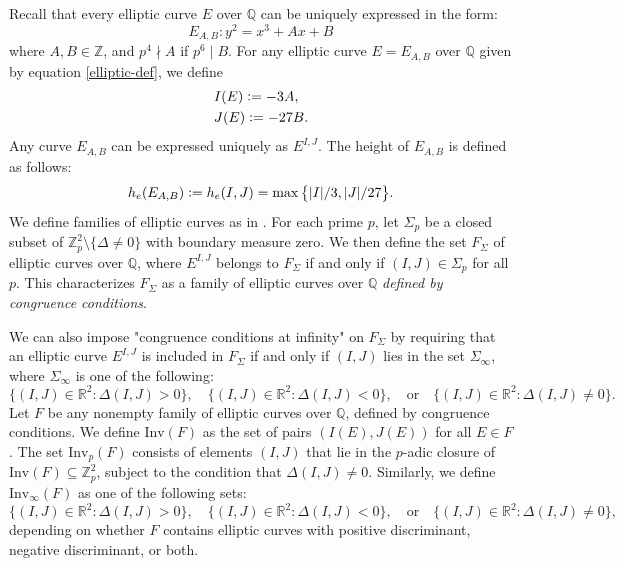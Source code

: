 \documentclass{article}
\begin{document}
Recall that every elliptic curve $E$ over $\mathbb{Q}$ can be uniquely expressed in the form:
\begin{equation}\label{elliptic-def}
E_{A,B}: y^2 = x^3 + Ax + B
\end{equation}
where $A, B \in \mathbb{Z}$, and  $p^4 \nmid A$ if $p^6 \mid B$. For any elliptic curve $E = E_{A,B}$ over $\mathbb{Q}$ given by equation \eqref{elliptic-def}, we define
\begin{equation*}
\begin{aligned}
&I(E) \vcentcolon=  - 3  A, \\
&J(E) \vcentcolon= -27  B.
\end{aligned}
\end{equation*}
Any curve $E_{A,B}$ can be expressed uniquely as $E^{I,J}$. The height of $E_{A,B}$ is defined as follows:
\begin{equation*}
h_e(E_{A,B}) \vcentcolon= h_e(I,J)  = \max \big\{|I|/3,|J|/27\big \}.
\end{equation*}
We define families of elliptic curves as in \cite{main}. For each prime $p$, let $\Sigma_p$ be a closed subset of $\mathbb{Z}_p^2 \setminus \{\Delta \neq 0\}$ with boundary measure zero. We then define the set $F_{\Sigma}$ of elliptic curves over $\mathbb{Q}$, where $E^{I,J}$ belongs to $F_{\Sigma}$ if and only if $(I, J) \in \Sigma_p$ for all $p$. This characterizes $F_{\Sigma}$ as a family of elliptic curves over $\mathbb{Q}$ \textit{defined by congruence conditions}.

We can also impose "congruence conditions at infinity" on $F_{\Sigma}$ by requiring that an elliptic curve $E^{I,J}$ is included in $F_{\Sigma}$ if and only if $(I, J)$ lies in the set $\Sigma_{\infty}$, where $\Sigma_{\infty}$ is one of the following: 
\begin{equation*}
\{(I, J) \in \mathbb{R}^2 : \Delta(I, J) > 0\}, \quad \{(I, J) \in \mathbb{R}^2 : \Delta(I, J) < 0\}, \quad \text{or} \quad \{(I, J) \in \mathbb{R}^2 : \Delta(I, J) \neq 0\}.
\end{equation*}
Let $F$ be any nonempty family of elliptic curves over $\mathbb{Q}$, defined by congruence conditions. We define $\mathrm{Inv}(F)$ as the set of pairs $(I(E), J(E))$ for all $E \in F$. The set $\mathrm{Inv}_p(F)$ consists of elements $(I, J)$ that lie in the $p$-adic closure of $\mathrm{Inv}(F) \subseteq \mathbb{Z}_p^2$, subject to the condition that $\Delta(I, J) \neq 0$. Similarly, we define $\mathrm{Inv}_{\infty}(F)$ as one of the following sets:
\begin{equation*}
\{(I, J) \in \mathbb{R}^2 : \Delta(I, J) > 0\}, \quad \{(I, J) \in \mathbb{R}^2 : \Delta(I, J) < 0\}, \quad \text{or} \quad \{(I, J) \in \mathbb{R}^2 : \Delta(I, J) \neq 0\},
\end{equation*}
depending on whether $F$ contains elliptic curves with positive discriminant, negative discriminant, or both.
\end{document}
